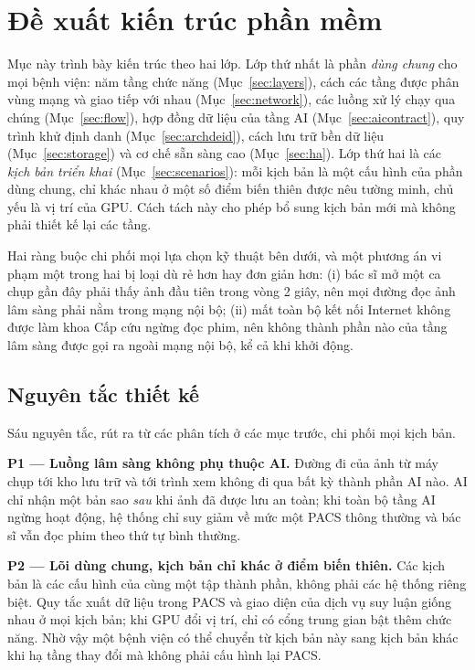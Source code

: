 \section{Đề xuất kiến trúc phần mềm}
\label{sec:architecture}



Mục này trình bày kiến trúc theo hai lớp. Lớp thứ nhất là phần \emph{dùng chung}
cho mọi bệnh viện: năm tầng chức năng (Mục~\ref{sec:layers}), cách các tầng được
phân vùng mạng và giao tiếp với nhau (Mục~\ref{sec:network}), các luồng xử lý chạy
qua chúng (Mục~\ref{sec:flow}), hợp đồng dữ liệu của tầng AI
(Mục~\ref{sec:aicontract}), quy trình khử định danh (Mục~\ref{sec:archdeid}), cách
lưu trữ bền dữ liệu (Mục~\ref{sec:storage}) và cơ chế sẵn sàng cao
(Mục~\ref{sec:ha}). Lớp thứ hai là các \emph{kịch bản triển khai}
(Mục~\ref{sec:scenarios}): mỗi kịch bản là một cấu hình của phần dùng chung, chỉ
khác nhau ở một số điểm biến thiên được nêu tường minh, chủ yếu là vị trí của GPU.
Cách tách này cho phép bổ sung kịch bản mới mà không phải thiết kế lại các tầng.

Hai ràng buộc chi phối mọi lựa chọn kỹ thuật bên dưới, và một phương án vi phạm một
trong hai bị loại dù rẻ hơn hay đơn giản hơn: (i) bác sĩ mở một ca chụp gần đây phải
thấy ảnh đầu tiên trong vòng 2 giây, nên mọi đường đọc ảnh lâm sàng phải nằm trong
mạng nội bộ; (ii) mất toàn bộ kết nối Internet không được làm khoa Cấp cứu ngừng đọc
phim, nên không thành phần nào của tầng lâm sàng được gọi ra ngoài mạng nội bộ, kể cả
khi khởi động.

\subsection{Nguyên tắc thiết kế}

Sáu nguyên tắc, rút ra từ các phân tích ở các mục trước, chi phối mọi kịch bản.

\textbf{P1 --- Luồng lâm sàng không phụ thuộc AI.} Đường đi của ảnh từ máy chụp tới
kho lưu trữ và tới trình xem không đi qua bất kỳ thành phần AI nào. AI chỉ nhận một
bản sao \emph{sau} khi ảnh đã được lưu an toàn; khi toàn bộ tầng AI ngừng hoạt động,
hệ thống chỉ suy giảm về mức một PACS thông thường và bác sĩ vẫn đọc phim theo thứ
tự bình thường.

\textbf{P2 --- Lõi dùng chung, kịch bản chỉ khác ở điểm biến thiên.} Các kịch bản là
các cấu hình của cùng một tập thành phần, không phải các hệ thống riêng biệt. Quy tắc
xuất dữ liệu trong PACS và giao diện của dịch vụ suy luận giống nhau ở mọi kịch bản;
khi GPU đổi vị trí, chỉ có cổng trung gian bật thêm chức năng. Nhờ vậy một bệnh viện
có thể chuyển từ kịch bản này sang kịch bản khác khi hạ tầng thay đổi mà không phải
cấu hình lại PACS.

